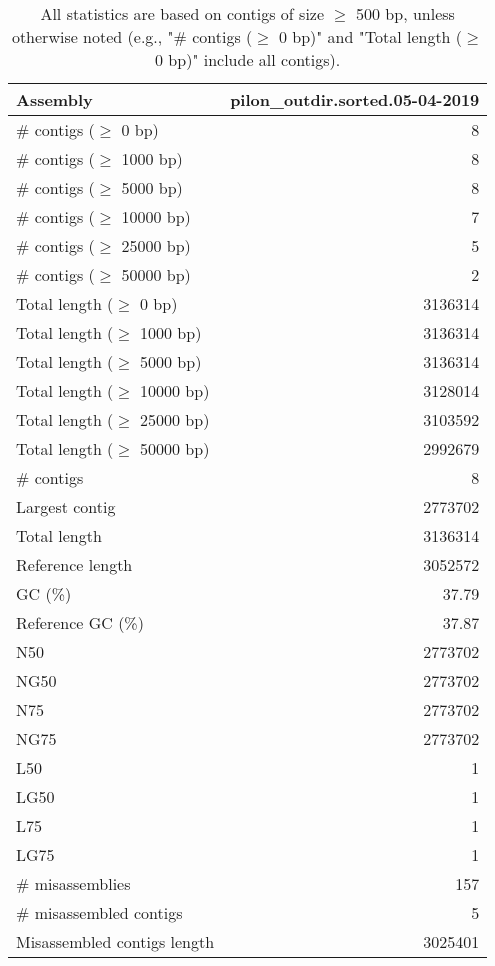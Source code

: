 \documentclass[12pt,a4paper]{article}
\begin{document}
\begin{table}[ht]
\begin{center}
\caption{All statistics are based on contigs of size $\geq$ 500 bp, unless otherwise noted (e.g., "\# contigs ($\geq$ 0 bp)" and "Total length ($\geq$ 0 bp)" include all contigs).}
\begin{tabular}{|l*{1}{|r}|}
\hline
Assembly & pilon\_outdir.sorted.05-04-2019 \\ \hline
\# contigs ($\geq$ 0 bp) & 8 \\ \hline
\# contigs ($\geq$ 1000 bp) & 8 \\ \hline
\# contigs ($\geq$ 5000 bp) & 8 \\ \hline
\# contigs ($\geq$ 10000 bp) & 7 \\ \hline
\# contigs ($\geq$ 25000 bp) & 5 \\ \hline
\# contigs ($\geq$ 50000 bp) & 2 \\ \hline
Total length ($\geq$ 0 bp) & 3136314 \\ \hline
Total length ($\geq$ 1000 bp) & 3136314 \\ \hline
Total length ($\geq$ 5000 bp) & 3136314 \\ \hline
Total length ($\geq$ 10000 bp) & 3128014 \\ \hline
Total length ($\geq$ 25000 bp) & 3103592 \\ \hline
Total length ($\geq$ 50000 bp) & 2992679 \\ \hline
\# contigs & 8 \\ \hline
Largest contig & 2773702 \\ \hline
Total length & 3136314 \\ \hline
Reference length & 3052572 \\ \hline
GC (\%) & 37.79 \\ \hline
Reference GC (\%) & 37.87 \\ \hline
N50 & 2773702 \\ \hline
NG50 & 2773702 \\ \hline
N75 & 2773702 \\ \hline
NG75 & 2773702 \\ \hline
L50 & 1 \\ \hline
LG50 & 1 \\ \hline
L75 & 1 \\ \hline
LG75 & 1 \\ \hline
\# misassemblies & 157 \\ \hline
\# misassembled contigs & 5 \\ \hline
Misassembled contigs length & 3025401 \\ \hline

\end{tabular}
\end{center}
\end{table}
\end{document}
